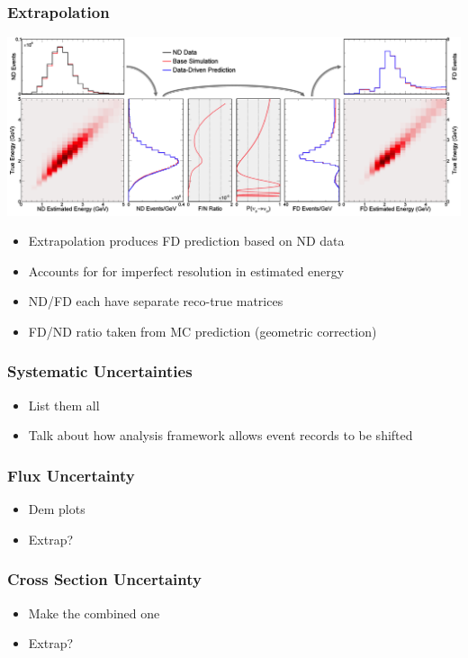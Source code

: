\documentclass[10pt,professionalfonts,xcolor=table]{beamer}
\begin{document}
\begin{frame}
\frametitle{Extrapolation}
  \begin{center}
   \includegraphics[width=\textwidth]{figures/figures/extrap_schematic.png}
  \end{center}

  \begin{itemize}
  \item Extrapolation produces FD prediction based on ND data
  \item Accounts for for imperfect resolution in estimated energy
  \item ND/FD each have separate reco-true matrices
  \item FD/ND ratio taken from MC prediction (geometric correction)
  \end{itemize}
\end{frame}


\begin{frame}
\frametitle{Systematic Uncertainties}
\begin{itemize}
\item List them all
\item Talk about how analysis framework allows event records to be shifted
\end{itemize}
\end{frame}


\begin{frame}
\frametitle{Flux Uncertainty}
\begin{itemize}
\item Dem plots
\item Extrap?
\end{itemize}
\end{frame}

\begin{frame}
\frametitle{Cross Section Uncertainty}
\begin{itemize}
\item Make the combined one
\item Extrap?
\end{itemize}
\end{frame}
\end{document}
